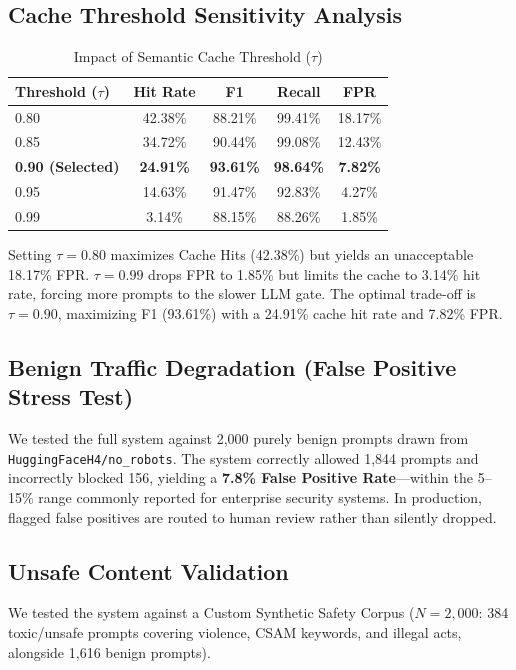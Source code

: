 \documentclass[conference]{IEEEtran}
\begin{document}
\subsection{Cache Threshold Sensitivity Analysis}

\begin{table}[htbp]
\centering
\caption{Impact of Semantic Cache Threshold ($\tau$)}
\label{tab:threshold-sensitivity}
\begin{tabular}{@{}lcccc@{}}
\toprule
\textbf{Threshold ($\tau$)} & \textbf{Hit Rate} & \textbf{F1} & \textbf{Recall} & \textbf{FPR} \\
\midrule
0.80 & 42.38\% & 88.21\% & 99.41\% & 18.17\% \\
0.85 & 34.72\% & 90.44\% & 99.08\% & 12.43\% \\
\textbf{0.90 (Selected)} & \textbf{24.91\%} & \textbf{93.61\%} & \textbf{98.64\%} & \textbf{7.82\%} \\
0.95 & 14.63\% & 91.47\% & 92.83\% & 4.27\% \\
0.99 & 3.14\% & 88.15\% & 88.26\% & 1.85\% \\
\bottomrule
\end{tabular}
\end{table}

Setting $\tau=0.80$ maximizes Cache Hits (42.38\%) but yields an unacceptable 18.17\% FPR. $\tau=0.99$ drops FPR to 1.85\% but limits the cache to 3.14\% hit rate, forcing more prompts to the slower LLM gate. The optimal trade-off is $\tau=0.90$, maximizing F1 (93.61\%) with a 24.91\% cache hit rate and 7.82\% FPR.

\subsection{Benign Traffic Degradation (False Positive Stress Test)}

We tested the full system against 2,000 purely benign prompts drawn from \texttt{HuggingFaceH4/no\_robots}. The system correctly allowed 1,844 prompts and incorrectly blocked 156, yielding a \textbf{7.8\% False Positive Rate}---within the 5--15\% range commonly reported for enterprise security systems. In production, flagged false positives are routed to human review rather than silently dropped.

\subsection{Unsafe Content Validation}

We tested the system against a Custom Synthetic Safety Corpus ($N{=}2{,}000$: 384 toxic/unsafe prompts covering violence, CSAM keywords, and illegal acts, alongside 1,616 benign prompts).
\end{document}
